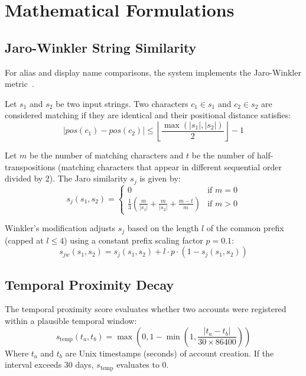 \section{Mathematical Formulations}
\label{sec:algo-math}

\subsection{Jaro-Winkler String Similarity}
For alias and display name comparisons, the system implements the Jaro-Winkler metric~\cite{jaro1989advances,winkler1990string}.

Let $s_1$ and $s_2$ be two input strings. Two characters $c_1 \in s_1$ and $c_2 \in s_2$ are considered matching if they are identical and their positional distance satisfies:
\begin{equation}
\label{eq:jaro-window}
|pos(c_1) - pos(c_2)| \le \left\lfloor \frac{\max(|s_1|, |s_2|)}{2} \right\rfloor - 1
\end{equation}

Let $m$ be the number of matching characters and $t$ be the number of half-transpositions (matching characters that appear in different sequential order divided by 2). The Jaro similarity $s_j$ is given by:
\begin{equation}
\label{eq:jaro-similarity}
s_j(s_1, s_2) = \begin{cases} 
0 & \text{if } m = 0 \\
\frac{1}{3} \left( \frac{m}{|s_1|} + \frac{m}{|s_2|} + \frac{m - t}{m} \right) & \text{if } m > 0 
\end{cases}
\end{equation}

Winkler's modification adjusts $s_j$ based on the length $l$ of the common prefix (capped at $l \le 4$) using a constant prefix scaling factor $p = 0.1$:
\begin{equation}
\label{eq:jaro-winkler}
s_{jw}(s_1, s_2) = s_j(s_1, s_2) + l \cdot p \cdot (1 - s_j(s_1, s_2))
\end{equation}

\subsection{Temporal Proximity Decay}
The temporal proximity score evaluates whether two accounts were registered within a plausible temporal window:
\begin{equation}
\label{eq:temporal-proximity}
s_{\text{temp}}(t_a, t_b) = \max\left(0, 1 - \min\left(1, \frac{|t_a - t_b|}{30 \times 86400}\right)\right)
\end{equation}
Where $t_a$ and $t_b$ are Unix timestamps (seconds) of account creation. If the interval exceeds 30 days, $s_{\text{temp}}$ evaluates to 0.

